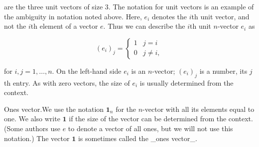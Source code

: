 are the three unit vectors of size \(3\). The notation for unit vectors is an example of the ambiguity in notation noted above. Here, \(e_{i}\) denotes the \(i\)th unit vector, and not the \(i\)th element of a vector \(e\). Thus we can describe the \(i\)th unit \(n\)-vector \(e_{i}\) as

\[(e_{i})_{j}=\left\{\begin{array}{ll}1&j=i\\ 0&j\neq i,\end{array}\right.\]

for \(i,j=1,\ldots,n\). On the left-hand side \(e_{i}\) is an \(n\)-vector; \((e_{i})_{j}\) is a number, its \(j\)th entry. As with zero vectors, the size of \(e_{i}\) is usually determined from the context.

Ones vector.We use the notation \(\mathbf{1}_{n}\) for the \(n\)-vector with all its elements equal to one. We also write \(\mathbf{1}\) if the size of the vector can be determined from the context. (Some authors use \(e\) to denote a vector of all ones, but we will not use this notation.) The vector \(\mathbf{1}\) is sometimes called the _ones vector_.

 
